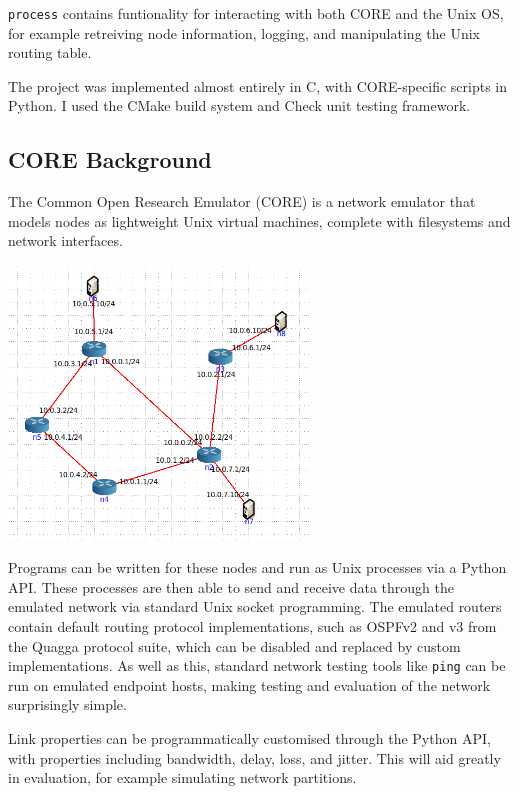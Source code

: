 \documentclass[10pt,twoside,a4paper]{article}
\begin{document}
\texttt{process} contains funtionality for interacting with both CORE and the Unix OS, for example retreiving node information, logging, and manipulating the Unix routing table.

The project was implemented almost entirely in C, with CORE-specific scripts in Python. I used the CMake build system and Check unit testing framework.


\subsection{CORE Background}

The Common Open Research Emulator (CORE) is a network emulator that models nodes as lightweight Unix virtual machines, complete with filesystems and network interfaces.

\begin{minipage}{1\textwidth} \centering
	\includegraphics[width=0.6\textwidth]{core_topology}
\end{minipage}

Programs can be written for these nodes and run as Unix processes via a Python API. These processes are then able to send and receive data through the emulated network via standard Unix socket programming. The emulated routers contain default routing protocol implementations, such as OSPFv2 and v3 from the Quagga protocol suite, which can be disabled and replaced by custom implementations. As well as this, standard network testing tools like \texttt{ping} can be run on emulated endpoint hosts, making testing and evaluation of the network surprisingly simple.

Link properties can be programmatically customised through the Python API, with properties including bandwidth, delay, loss, and jitter. This will aid greatly in evaluation, for example simulating network partitions.
\end{document}
